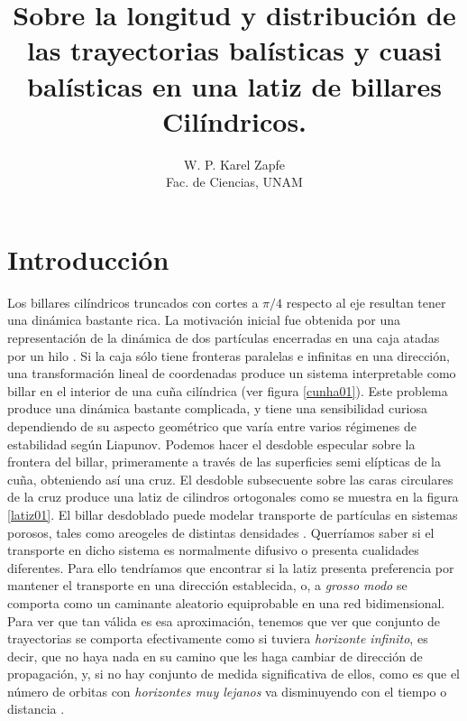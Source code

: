 \documentclass[letterpaper,12pt]{article}
\title{Sobre la longitud y distribución de las trayectorias balísticas y cuasi balísticas en una latiz de billares Cilíndricos.}
\author{ W. P. Karel Zapfe\\Fac. de Ciencias, UNAM}
\begin{document}
\maketitle


\section{Introducción}

Los billares cilíndricos truncados con cortes a $\pi/4$ respecto al eje 
resultan tener una dinámica bastante rica. La motivación inicial
fue obtenida por una representación de la dinámica de dos partículas
encerradas en una caja atadas por un hilo \cite{SandersGilbert}. 
Si la caja sólo tiene fronteras paralelas e infinitas en una dirección,
una transformación lineal de coordenadas produce
un sistema interpretable como  billar
en el interior de una cuña cilíndrica (ver figura \ref{cunha01}).
 Este problema produce una dinámica bastante complicada, y tiene una
sensibilidad curiosa dependiendo de su aspecto geométrico que varía entre 
varios régimenes de estabilidad según Liapunov.
Podemos hacer el desdoble
especular sobre la frontera del billar, primeramente
a través de las superficies semi elípticas de la cuña,
obteniendo así una cruz.
El desdoble subsecuente sobre las
caras circulares de la cruz produce una latiz
de cilindros ortogonales como se muestra
en la figura \ref{latiz01}. El billar desdoblado
puede modelar transporte de partículas en sistemas porosos,
tales como areogeles de distintas densidades \cite{Veamos}.
Querríamos saber si el transporte en dicho sistema es normalmente
difusivo o presenta cualidades diferentes. Para ello
tendríamos que encontrar si la latiz
presenta preferencia por mantener el transporte en una
dirección establecida, o, a \emph{grosso modo} se comporta como
un caminante aleatorio equiprobable en una red bidimensional.
Para ver que tan válida es esa aproximación, tenemos que ver
que conjunto de trayectorias se comporta
efectivamente como si tuviera \emph{horizonte infinito}, es
decir, que no haya nada en su camino que les haga cambiar de dirección
de propagación, y, si no hay conjunto de medida significativa de ellos,
como es que el número de orbitas con \emph{horizontes muy lejanos}
va disminuyendo con el tiempo o distancia \cite{SandersHorizon}. 
\end{document}

